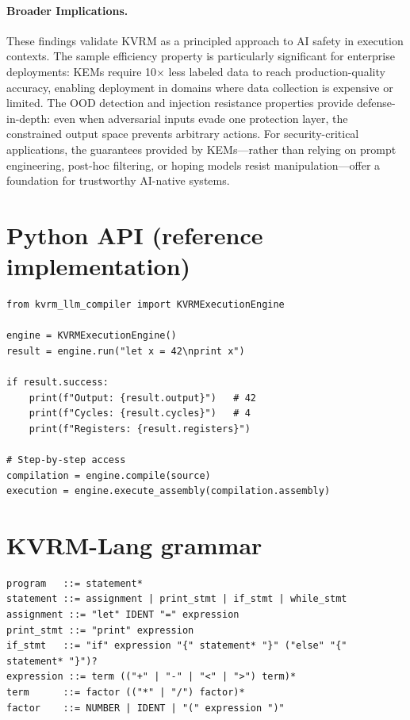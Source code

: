 \documentclass[11pt]{article}
\begin{document}
\paragraph{Broader Implications.}
These findings validate KVRM as a principled approach to AI safety in execution contexts.
The sample efficiency property is particularly significant for enterprise deployments: KEMs require 10$\times$ less labeled data to reach production-quality accuracy, enabling deployment in domains where data collection is expensive or limited.
The OOD detection and injection resistance properties provide defense-in-depth: even when adversarial inputs evade one protection layer, the constrained output space prevents arbitrary actions.
For security-critical applications, the guarantees provided by KEMs---rather than relying on prompt engineering, post-hoc filtering, or hoping models resist manipulation---offer a foundation for trustworthy AI-native systems.

\appendix
\section{Python API (reference implementation)}
\begin{lstlisting}[caption={KVRM execution engine API (illustrative).}]
from kvrm_llm_compiler import KVRMExecutionEngine

engine = KVRMExecutionEngine()
result = engine.run("let x = 42\nprint x")

if result.success:
    print(f"Output: {result.output}")   # 42
    print(f"Cycles: {result.cycles}")   # 4
    print(f"Registers: {result.registers}")

# Step-by-step access
compilation = engine.compile(source)
execution = engine.execute_assembly(compilation.assembly)
\end{lstlisting}

\section{KVRM-Lang grammar}
\begin{lstlisting}[caption={BNF grammar for KVRM-Lang (prototype).}]
program   ::= statement*
statement ::= assignment | print_stmt | if_stmt | while_stmt
assignment ::= "let" IDENT "=" expression
print_stmt ::= "print" expression
if_stmt   ::= "if" expression "{" statement* "}" ("else" "{" statement* "}")?
expression ::= term (("+" | "-" | "<" | ">") term)*
term      ::= factor (("*" | "/") factor)*
factor    ::= NUMBER | IDENT | "(" expression ")"
\end{lstlisting}
\end{document}
